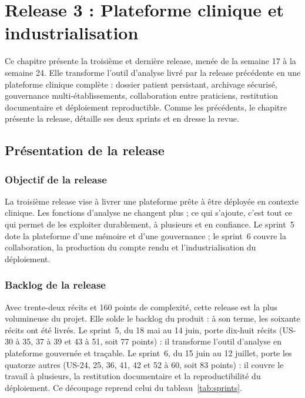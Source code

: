 \chapter{Release 3 : Plateforme clinique et industrialisation}
\label{chap:release3}


Ce chapitre présente la troisième et dernière release, menée de la semaine 17 à la
semaine 24. Elle transforme l'outil d'analyse livré par la release précédente en une
plateforme clinique complète : dossier patient persistant, archivage sécurisé, gouvernance
multi-établissements, collaboration entre praticiens, restitution documentaire et
déploiement reproductible. Comme les précédents, le chapitre présente la release, détaille
ses deux sprints et en dresse la revue.

\section{Présentation de la release}
\label{sec:release3}

\subsection{Objectif de la release}

La troisième release vise à livrer une plateforme prête à être déployée en
contexte clinique. Les fonctions d'analyse ne changent plus ; ce qui s'ajoute, c'est tout ce
qui permet de les exploiter durablement, à plusieurs et en confiance. Le sprint~5 dote la
plateforme d'une mémoire et d'une gouvernance ; le sprint~6 couvre la collaboration, la
production du compte rendu et l'industrialisation du déploiement.

\subsection{Backlog de la release}

Avec trente-deux récits et 160 points de complexité, cette release est la plus volumineuse
du projet. Elle solde le backlog du produit : à son terme, les soixante récits ont été
livrés. Le sprint~5, du 18 mai au 14 juin, porte dix-huit récits (US-30 à 35, 37 à 39 et
43 à 51, soit 77 points) : il transforme l'outil d'analyse en plateforme gouvernée et
traçable. Le sprint~6, du 15 juin au 12 juillet, porte les quatorze autres (US-24, 25, 36,
41, 42 et 52 à 60, soit 83 points) : il couvre le travail à plusieurs, la restitution
documentaire et la reproductibilité du déploiement. Ce découpage reprend celui du
tableau~\ref{tab:sprints}.


